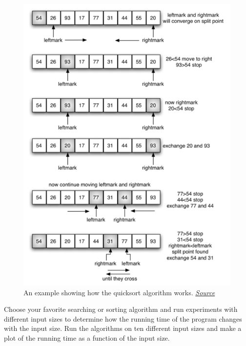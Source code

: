 \begin{figure}
    \centering
    \includegraphics[width=\textwidth]{images/quicksort.png}
    \caption{An example showing how the quicksort algorithm works. \href{https://runestone.academy/runestone/books/published/pythonds/SortSearch/TheQuickSort.html}{\textit{Source}}}
    \label{fig:insertion_sort}
\end{figure}


\begin{exercise}
Choose your favorite searching or sorting algorithm and run experiments with different input sizes to determine how the running time of the program changes with the input size. Run the algorithms on ten different input sizes and make a plot of the running time as a function of the input size.

\end{exercise}